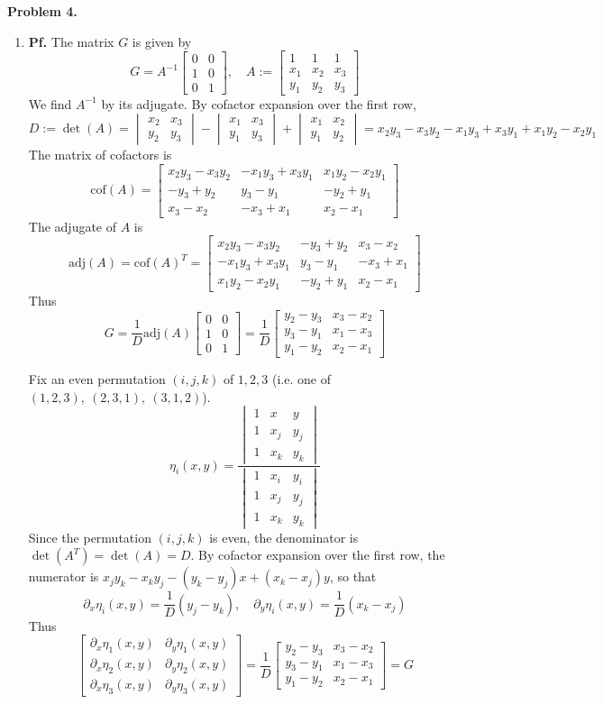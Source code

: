 \documentclass{article}
\def\tbf#1{\textbf{#1}}
\newcommand{\m}[2][b]{\begin{#1matrix}#2\end{#1matrix}}
\newcommand{\inv}{^{-1}}
\newcommand{\pf}{\tbf{Pf. }}
\newcommand{\ptl}{\partial}
\begin{document}
\tbf{Problem 4.}

\begin{enumerate}[label=(\alph*)]
	
\item \pf The matrix $G$ is given by
$$G = A\inv \m{0 & 0 \\ 1 & 0 \\ 0 & 1},
\quad A := \m{1 & 1 & 1 \\ x_1 & x_2 & x_3 \\ y_1 & y_2 & y_3}$$
We find $A\inv$ by its adjugate. By cofactor expansion over the first row,
$$D := \det(A)
= \m[v]{x_2 & x_3 \\ y_2 & y_3} - \m[v]{x_1 & x_3 \\ y_1 & y_3} + \m[v]{x_1 & x_2 \\ y_1 & y_2}
= x_2y_3 - x_3y_2 - x_1y_3 + x_3y_1 + x_1y_2 - x_2y_1$$
The matrix of cofactors is
$$\mathrm{cof}(A) = \m{x_2y_3-x_3y_2 & -x_1y_3+x_3y_1 & x_1y_2-x_2y_1 \\ -y_3+y_2 & y_3-y_1 & -y_2+y_1 \\ x_3-x_2 & -x_3+x_1 & x_2-x_1}$$
The adjugate of $A$ is
$$\mathrm{adj}(A) = \mathrm{cof}(A)^T
= \m{x_2y_3-x_3y_2 & -y_3+y_2  & x_3-x_2 \\ -x_1y_3+x_3y_1& y_3-y_1 & -x_3+x_1 \\ x_1y_2-x_2y_1 & -y_2+y_1 & x_2-x_1}$$
Thus
$$G = \frac{1}{D}\mathrm{adj}(A)\m{0 & 0 \\ 1 & 0 \\ 0 & 1}
= \frac{1}{D}\m{y_2-y_3 & x_3-x_2 \\ y_3-y_1 & x_1-x_3 \\ y_1-y_2 & x_2-x_1}$$

Fix an even permutation $(i,j,k)$ of $1,2,3$ (i.e. one of $(1,2,3),~(2,3,1),~(3,1,2)$).
$$\eta_i(x,y) = \frac{\m[v]{1 & x & y \\ 1 & x_j & y_j \\ 1 & x_k & y_k}}{\m[v]{1 & x_i & y_i \\ 1 & x_j & y_j \\ 1 & x_k & y_k}}$$
Since the permutation $(i,j,k)$ is even, the denominator is $\det(A^T)=\det(A)=D$. By cofactor expansion over the first row, the numerator is $x_jy_k - x_ky_j - (y_k - y_j)x + (x_k - x_j)y$, so that
$$\ptl_x\eta_i(x,y) = \frac{1}{D}(y_j-y_k),
\quad \ptl_y\eta_i(x,y) = \frac{1}{D}(x_k-x_j)$$
Thus
$$\m{\ptl_x\eta_1(x,y) & \ptl_y\eta_1(x,y) \\ \ptl_x\eta_2(x,y) & \ptl_y\eta_2(x,y) \\ \ptl_x\eta_3(x,y) & \ptl_y\eta_3(x,y)}
= \frac{1}{D}\m{y_2-y_3 & x_3-x_2 \\ y_3-y_1 & x_1-x_3 \\ y_1-y_2 & x_2-x_1}
= G$$



\end{enumerate}
\end{document}

